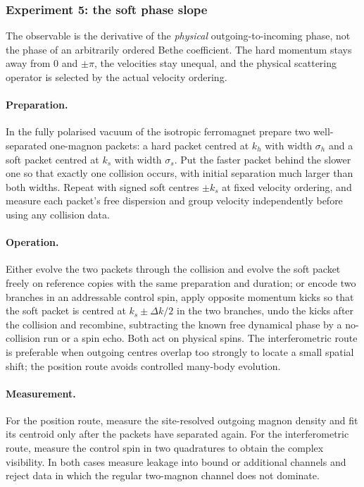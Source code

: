 \subsubsection*{Experiment 5: the soft phase slope}

The observable is the derivative of the \emph{physical} outgoing-to-incoming
phase, not the phase of an arbitrarily ordered Bethe coefficient. The hard
momentum stays away from $0$ and $\pm\pi$, the velocities stay unequal, and the
physical scattering operator is selected by the actual velocity ordering.

\paragraph{Preparation.} In the fully polarised vacuum of the isotropic
ferromagnet prepare two well-separated one-magnon packets: a hard packet
centred at $k_h$ with width $\sigma_h$ and a soft packet centred at $k_s$ with
width $\sigma_s$. Put the faster packet behind the slower one so that exactly
one collision occurs, with initial separation much larger than both widths.
Repeat with signed soft centres $\pm k_s$ at fixed velocity ordering, and
measure each packet's free dispersion and group velocity independently before
using any collision data.

\paragraph{Operation.} Either evolve the two packets through the collision and
evolve the soft packet freely on reference copies with the same preparation and
duration; or encode two branches in an addressable control spin, apply opposite
momentum kicks so that the soft packet is centred at $k_s\pm\Delta k/2$ in the
two branches, undo the kicks after the collision and recombine, subtracting the
known free dynamical phase by a no-collision run or a spin echo. Both act on
physical spins. The interferometric route is preferable when outgoing centres
overlap too strongly to locate a small spatial shift; the position route avoids
controlled many-body evolution.

\paragraph{Measurement.} For the position route, measure the site-resolved
outgoing magnon density and fit its centroid only after the packets have
separated again. For the interferometric route, measure the control spin in two
quadratures to obtain the complex visibility. In both cases measure leakage
into bound or additional channels and reject data in which the regular
two-magnon channel does not dominate.

